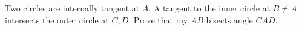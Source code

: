 Two circles are internally tangent at $A$. A tangent to the inner circle at $B\ne A$ intersects the outer circle at $C,D$. Prove that ray $AB$ bisects angle $CAD$.
